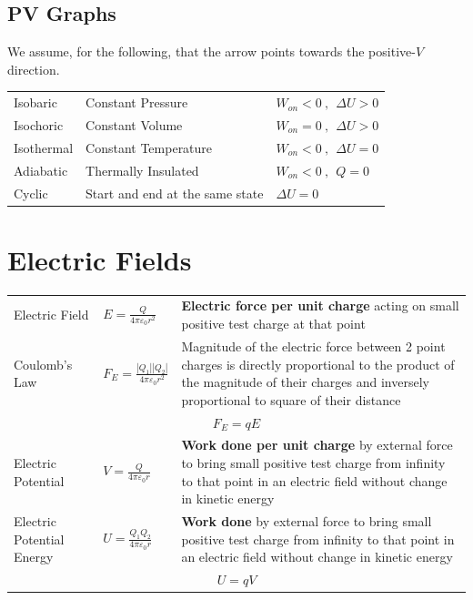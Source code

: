 \documentclass[a4paper,11pt]{article}
\begin{document}
		\subsection{PV Graphs}
			We assume, for the following, that the arrow points towards the positive-$V$ direction. 
			\begin{center}
				\renewcommand{\arraystretch}{1.2}
				\begin{tabular}{@{} l l l @{}}
					\toprule
					Isobaric & Constant Pressure  & $W_{on} < 0 ~,~~ \Delta U > 0$\\
					Isochoric & Constant Volume & $W_{on} = 0 ~,~~ \Delta U > 0$\\
					Isothermal & Constant Temperature & $W_{on} < 0 ~,~~ \Delta U = 0$\\
					Adiabatic & Thermally Insulated & $W_{on} < 0 ~,~~ Q = 0$\\
					Cyclic & Start and end at the same state & $\Delta U = 0$\\
					\bottomrule
				\end{tabular}
			\end{center}
	\section{Electric Fields}
	\begin{center}
		\renewcommand{\arraystretch}{1.2}
		\begin{tabular}{@{} l l p{8.5cm} @{}}
			\toprule
			Electric Field & $\displaystyle E=\frac{Q}{4\pi \varepsilon_0 r^2}$ & \textbf{Electric force per unit charge} acting on small positive test charge at that point \\
			Coulomb's Law & $\displaystyle F_E=\frac{|Q_1||Q_2|}{4\pi \varepsilon_0 r^2}$ & Magnitude of the electric force between 2 point charges is directly proportional to the product of the magnitude of their charges and inversely proportional to square of their distance\\
			\multicolumn{3}{c}{$F_E=qE$} \\
			\midrule
			Electric Potential & $\displaystyle V = \frac{Q}{4\pi \varepsilon_0 r}$ & \textbf{Work done per unit charge} by external force to bring small positive test charge from infinity to that point in an electric field without change in kinetic energy \\
			Electric Potential Energy & $\displaystyle U = \frac{Q_1 Q_2}{4\pi \varepsilon_0 r}$ & \textbf{Work done } by external force to bring small positive test charge from infinity to that point in an electric field without change in kinetic energy\\
			\multicolumn{3}{c}{$U=qV$} \\
			\bottomrule
		\end{tabular}
	\end{center}
	
\end{document}
